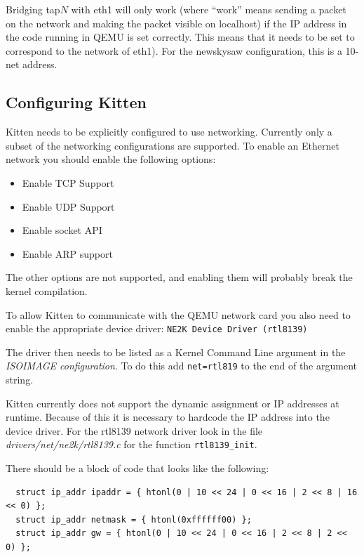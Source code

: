\documentclass[11pt]{article}
\begin{document}
Bridging tap$N$ with eth1 will only work (where ``work'' means sending
a packet on the network and making the packet visible on localhost) if
the IP address in the code running in QEMU is set correctly.  This
means that it needs to be set to correspond to the network of eth1).  
For the newskysaw configuration, this is a 10-net address.


\subsection{Configuring Kitten}

Kitten needs to be explicitly configured to use networking. Currently
only a subset of the networking configurations are supported. To
enable an Ethernet network you should enable the following options:

\begin{itemize}
\item Enable TCP Support
\item Enable UDP Support
\item Enable socket API
\item Enable ARP support
\end{itemize}

The other options are not supported, and enabling them will probably
break the kernel compilation.

To allow Kitten to communicate with the QEMU network card you also
need to enable the appropriate device driver: \newline
\verb.NE2K Device Driver (rtl8139).

The driver then needs to be listed as a Kernel Command Line argument
in the {\em ISOIMAGE configuration}. To do this add
\verb.net=rtl819. to the end of the argument string.

Kitten currently does not support the dynamic assignment or IP
addresses at runtime. Because of this it is necessary to hardcode the
IP address into the device driver. For the rtl8139 network driver look
in the file {\em drivers/net/ne2k/rtl8139.c} for the function
\verb.rtl8139_init..

There should be a block of code that looks like the following:
\begin{verbatim}
  struct ip_addr ipaddr = { htonl(0 | 10 << 24 | 0 << 16 | 2 << 8 | 16 << 0) }; 
  struct ip_addr netmask = { htonl(0xffffff00) }; 
  struct ip_addr gw = { htonl(0 | 10 << 24 | 0 << 16 | 2 << 8 | 2 << 0) };
\end{verbatim}
\end{document}
